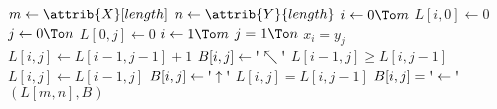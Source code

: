 \begin{codebox}
\li $m \gets \attrib{X}[length]$
\li $n \gets \attrib{Y}{length}$
\li \For $i \gets 0 \To m$
\li \Do $L[i,0] \gets 0$
	\End
\li \For $j \gets 0 \To n$
\li \Do $L[0,j] \gets 0$
	\End
\li \For $i \gets 1 \To m$
\li \Do	\For $j = 1 \To n$
\li 	\Do	\If $x_i = y_j$
\li 		\Then
				$L[i,j] \gets L[i-1,j-1] + 1$
\li				$B[i,j] \gets \textnormal{\textquotesingle}\nwarrow\textnormal{\textquotesingle}$
\li			\ElseIf $L[i-1,j] \geq L[i,j-1]$
\li			\Then
				$L[i,j] \gets L[i-1,j]$
\li				$B[i,j] \gets \textnormal{\textquotesingle}\uparrow\textnormal{\textquotesingle}$
\li			\ElseNoIf
\li				$L[i,j] = L[i,j-1]$
\li				$B[i,j] = \textnormal{\textquotesingle}\leftarrow\textnormal{\textquotesingle}$
			\End
		\End
	\End
\li \Return $(L[m,n],B)$
\end{codebox}